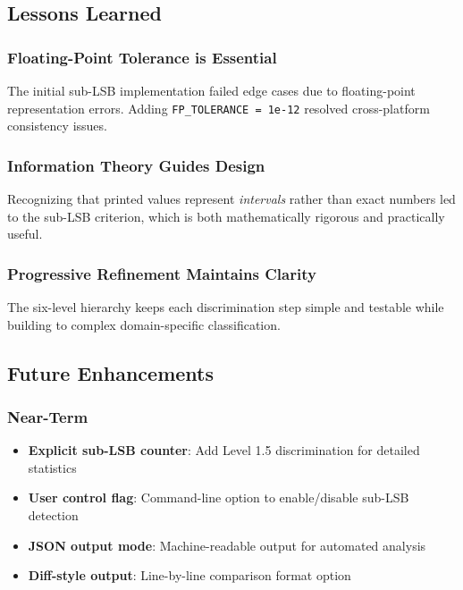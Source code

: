 \subsection{Lessons Learned}

\subsubsection{Floating-Point Tolerance is Essential}

The initial sub-LSB implementation failed edge cases due to floating-point representation errors. Adding \texttt{FP\_TOLERANCE = 1e-12} resolved cross-platform consistency issues.

\subsubsection{Information Theory Guides Design}

Recognizing that printed values represent \emph{intervals} rather than exact numbers led to the sub-LSB criterion, which is both mathematically rigorous and practically useful.

\subsubsection{Progressive Refinement Maintains Clarity}

The six-level hierarchy keeps each discrimination step simple and testable while building to complex domain-specific classification.

\subsection{Future Enhancements}

\subsubsection{Near-Term}

\begin{itemize}
    \item \textbf{Explicit sub-LSB counter}: Add Level 1.5 discrimination for detailed statistics

    \item \textbf{User control flag}: Command-line option to enable/disable sub-LSB detection

    \item \textbf{JSON output mode}: Machine-readable output for automated analysis

    \item \textbf{Diff-style output}: Line-by-line comparison format option
\end{itemize}

